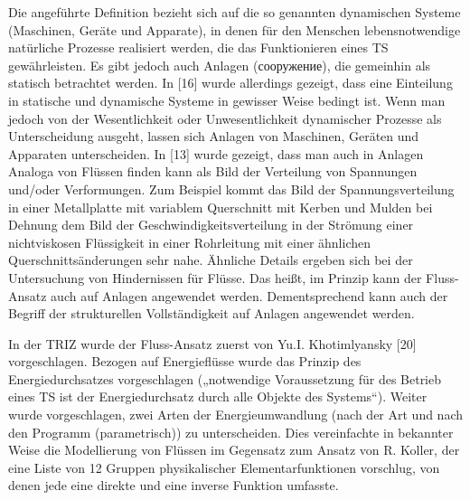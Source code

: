 \documentclass[11pt,a4paper]{article}
\begin{document}
Die angeführte Definition bezieht sich auf die so genannten dynamischen
Systeme (Maschinen, Geräte und Apparate), in denen für den Menschen
lebensnotwendige natürliche Prozesse realisiert werden, die das Funktionieren
eines TS gewährleisten. Es gibt jedoch auch Anlagen
(\foreignlanguage{russian}{сооружение}), die gemeinhin als statisch betrachtet
werden.  In [16] wurde allerdings gezeigt, dass eine Einteilung in statische
und dynamische Systeme in gewisser Weise bedingt ist.  Wenn man jedoch von der
Wesentlichkeit oder Unwesentlichkeit dynamischer Prozesse als Unterscheidung
ausgeht, lassen sich Anlagen von Maschinen, Geräten und Apparaten
unterscheiden.  In [13] wurde gezeigt, dass man auch in Anlagen Analoga von
Flüssen finden kann als Bild der Verteilung von Spannungen und/oder
Verformungen.  Zum Beispiel kommt das Bild der Spannungsverteilung in einer
Metallplatte mit variablem Querschnitt mit Kerben und Mulden bei Dehnung dem
Bild der Geschwindigkeitsverteilung in der Strömung einer nichtviskosen
Flüssigkeit in einer Rohrleitung mit einer ähnlichen Querschnittsänderungen
sehr nahe. Ähnliche Details ergeben sich bei der Untersuchung von Hindernissen
für Flüsse.  Das heißt, im Prinzip kann der Fluss-Ansatz auch auf Anlagen
angewendet werden. Dementsprechend kann auch der Begriff der strukturellen
Vollständigkeit auf Anlagen angewendet werden.

\begin{emph}
  In der TRIZ wurde der Fluss-Ansatz zuerst von Yu.I. Khotimlyansky [20]
  vorgeschlagen. Bezogen auf Energieflüsse wurde das Prinzip des
  Energiedurchsatzes vorgeschlagen („notwendige Voraussetzung für des Betrieb
  eines TS ist der Energiedurchsatz durch alle Objekte des Systems“).  Weiter
  wurde vorgeschlagen, zwei Arten der Energieumwandlung (nach der Art und nach
  den Programm (parametrisch)) zu unterscheiden.  Dies vereinfachte in
  bekannter Weise die Modellierung von Flüssen im Gegensatz zum Ansatz von
  R. Koller, der eine Liste von 12 Gruppen  physikalischer
  Elementarfunktionen vorschlug, von denen jede eine direkte und eine inverse
  Funktion umfasste.
\end{emph}
\end{document}
